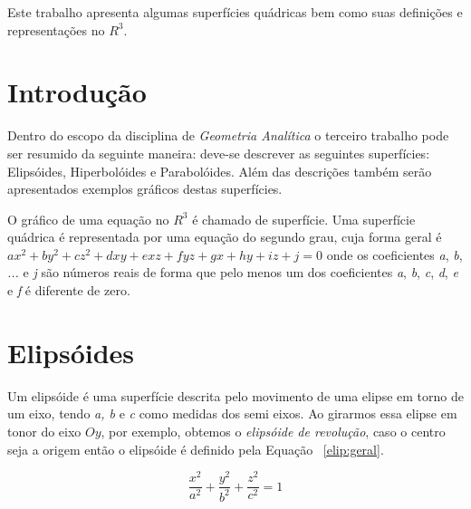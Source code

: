 \documentclass[
	article,			%
	11pt,				%
	oneside,			%
	a4paper,			%
	english,			%
	brazil,				%
	]{abntex2}
\begin{document}
\frenchspacing 

\maketitle

\begin{resumoumacoluna}
    
		Este trabalho apresenta algumas superfícies quádricas bem como suas
		definições e representações no $R^3$.

 \vspace{\onelineskip}
 
 \noindent
\end{resumoumacoluna}

\textual

    \section*{Introdução}

		Dentro do escopo da disciplina de \emph{Geometria Analítica} o terceiro
		trabalho pode ser resumido da seguinte maneira: deve-se descrever as
		seguintes superfícies:  Elipsóides, Hiperbolóides e Parabolóides. Além
		das descrições também serão apresentados exemplos gráficos destas
		superfícies.

		O gráfico de uma equação no $R^3$ é chamado de superfície. Uma
		superfície quádrica é representada por uma equação do segundo grau, cuja
		forma geral é $ ax^2 + by^2 + cz^2 + dxy + exz + fyz + gx + hy + iz + j
		= 0$ onde os coeficientes \emph{a}, \emph{b}, \emph{...} e \emph{j} são
		números reais de forma que pelo menos um dos coeficientes \emph{a},
		\emph{b}, \emph{c}, \emph{d}, \emph{e} e \emph{f} é diferente de zero.

    \section{Elipsóides}

		Um elipsóide é uma superfície descrita pelo movimento de uma elipse em
		torno de um eixo, tendo \emph{a, b} e \emph{c} como medidas dos semi
		eixos. Ao girarmos essa elipse em tonor do eixo $Oy$, por exemplo,
		obtemos o \emph{elipsóide de revolução}, caso o centro seja a origem
		então o elipsóide é definido pela Equação ~\ref{elip:geral}.

		\begin{equation}\label{elip:geral}
			\frac{x^2}{a^2}+\frac{y^2}{b^2}+\frac{z^2}{c^2}=1
		\end{equation}
\end{document}
